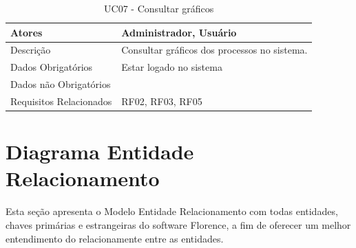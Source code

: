 \documentclass[portuguese,oneside]{tcc}
\begin{document}
\begin{table}
\centering
\caption{UC07 - Consultar gráficos} \label{table:uc07}
\begin{tabular}{ |p{5cm}|p{5cm}|  }

\hline
Atores & 
Administrador, Usuário\\

\hline
Descrição & 
 
Consultar gráficos dos processos no sistema.
 \\

\hline
Dados Obrigatórios & Estar logado no sistema
 \\

\hline
Dados não Obrigatórios & 
 \\

\hline
Requisitos Relacionados & 
RF02, RF03, RF05
 \\

\hline

\end{tabular}
\end{table}


\section{Diagrama Entidade Relacionamento}
Esta seção apresenta o Modelo Entidade Relacionamento com todas entidades, chaves primárias e estrangeiras do software Florence, a fim de oferecer um melhor entendimento do relacionamente entre as entidades.
\end{document}
